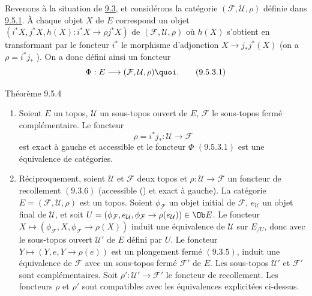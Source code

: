 \subsubsection{}
Revenons à la situation de \hyperref[IV.subsec9.3]{9.3}, et considérons la
catégorie $(\mathcal{F},\mathcal{U}, \rho)$ définie dans
\hyperref[IV.subsubsec9.5.1]{9.5.1}. À chaque objet $X$ de $E$ correspond un
objet $(i^{\ast}X, j^{\ast}X, h(X):i^{\ast}X\rightarrow \rho
j^{\ast}X)$ de $(\mathcal{F}, \mathcal{U},\rho)$ où $h(X)$ s'obtient
en transformant par le foncteur $i^{\ast}$ le morphisme d'adjonction
$X\rightarrow j_{\ast}j^{\ast}(X)$ (on a $\rho=i^{\ast}j_{\ast}$
). On a donc défini ainsi un foncteur
\begin{equation*}
\Phi:E\longrightarrow (\mathcal{F}, \mathcal{U},
\rho){\quoi}.\tag{9.5.3.1}
\end{equation*}

\begin{enonce*}{Théorème 9.5.4}
\begin{enumerate}
\renewcommand{\theenumi}{\alph{enumi}}
\renewcommand{\labelenumi}{\theenumi)}
\item Soient $E$ un topos, $\mathcal{U}$ un sous-topos ouvert de $E$,
$\mathcal{F}$ le sous-topos fermé complémentaire. Le foncteur
$$
\rho=i^{\ast}j_{\ast}:\mathcal{U} \longrightarrow \mathcal{F}
$$
est exact à gauche et accessible et le foncteur $\Phi$ $(9.5.3.1)$
est une équivalence de catégories.

\item Réciproquement, soient $\mathcal{U}$ et $\mathcal{F}$ deux topos et
$\rho:\mathcal{U}\rightarrow \mathcal{F}$ un foncteur de recollement
$(\hyperref[IV.subsubsec9.3.6]{9.3.6})$ (\ie accessible {\rm ()}
et exact à gauche). La catégorie $E=(\mathcal{F},\mathcal{U},\rho)$
est un topos. Soient $\phi_{\mathcal{F}}$ un objet initial de
$\mathcal{F}$, $e_{\mathcal{U}}$ un objet final de $\mathcal{U}$, et
soit $U=(\phi_{\mathcal{F}},e_{\mathcal{U}},
\phi_{\mathcal{F}}\rightarrow \rho(e_{\mathcal{U}}))\in \Ob E$. Le
foncteur $X\mapsto (\phi_{\mathcal{F}},
X,\phi_{\mathcal{F}}\rightarrow \rho(X))$ induit une équivalence de
$\mathcal{U}$ sur $E_{/U}$, donc avec le sous-topos ouvert
$\mathcal{U}'$ de $E$ défini par $U$. Le foncteur $Y\mapsto
(Y,e,Y\rightarrow \rho(e))$ est un plongement fermé
$(\hyperref[IV.subsubsec9.3.5]{9.3.5})$, \ie induit une équivalence de
$\mathcal{F}$ avec un sous-topos fermé $\mathcal{F}'$ de $E$. Les
sous-topos $\mathcal{U}'$ et $\mathcal{F}'$\pageoriginale sont
complémentaires. Soit $\rho':\mathcal{U}'\rightarrow \mathcal{F}'$
le foncteur de recollement. Les foncteurs $\rho$ et $\rho'$ sont
compatibles avec les équivalences explicitées ci-dessus.
\end{enumerate}
\end{enonce*}

